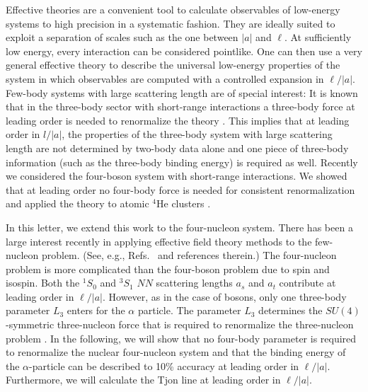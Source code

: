 \documentclass[prc,preprint,tightenlines,showpacs]{revtex4}
\begin{document}
Effective theories are a convenient tool to calculate observables of low-energy
systems to high precision in a systematic fashion.  They are ideally
suited to exploit a separation of scales such as the one between $|a|$
and $\ell$. 
At sufficiently low energy, every interaction can be considered pointlike. One
can then use a very general effective theory to describe the universal
low-energy properties of the system in which observables are computed with
a controlled expansion in $\ell/|a|$.
Few-body systems with large scattering length are of special interest:
It is known that in the three-body sector with short-range interactions a 
three-body force at leading order is needed to renormalize the theory 
\cite{Bedaque:1998kg}.  This implies that at leading order
in $l/|a|$, the properties of the three-body system with large scattering
length are not determined by two-body data alone and one piece of
three-body information (such as the three-body binding energy) is required
as well.
Recently we considered the four-boson system with short-range interactions. We
showed that at leading order no four-body force is needed for 
consistent renormalization and applied the theory to atomic $^4$He
clusters \cite{Platter:2004qn}. 

In this letter, we extend this work to the four-nucleon system.
There has been a large interest recently in applying effective field theory
methods to the few-nucleon problem.
(See, e.g., Refs.~\cite{Bedaque:2002mn,Meissner:2004yy,Navratil:2003ib} 
and references therein.) 
The four-nucleon problem is more complicated than the four-boson problem due
to spin and isospin. Both the $^1S_0$ and $^3S_1$ $NN$ scattering lengths
$a_s$ and $a_t$ contribute at leading order in $\ell/|a|$. 
However, as in the case of bosons, only one three-body parameter $L_3$
enters for the $\alpha$ particle.
The parameter $L_3$ determines the $SU(4)$-symmetric 
three-nucleon force that is required to renormalize the three-nucleon 
problem \cite{Bedaque:1999ve}.
In the following, we will show that no four-body parameter is required
to renormalize the nuclear four-nucleon system and that
the binding energy of the $\alpha$-particle can be described to 10\%
accuracy at leading order in $\ell/|a|$. 
Furthermore, we will calculate the Tjon line at leading order 
in $\ell/|a|$.
\end{document}
